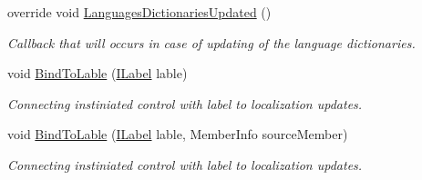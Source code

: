 \begin{DoxyCompactItemize}
override void \mbox{\hyperlink{class_wpf_handler_1_1_u_i_1_1_auto_layout_1_1_configuration_1_1_content_attribute_a498818bc121b7f408af302eb4085056a}{Languages\+Dictionaries\+Updated}} ()
\begin{DoxyCompactList}\small\item\em Callback that will occurs in case of updating of the language dictionaries. \end{DoxyCompactList}\item 
void \mbox{\hyperlink{class_wpf_handler_1_1_u_i_1_1_auto_layout_1_1_configuration_1_1_content_attribute_a6e768c541979b771942cf038e8ac084a}{Bind\+To\+Lable}} (\mbox{\hyperlink{interface_wpf_handler_1_1_u_i_1_1_controls_1_1_i_label}{I\+Label}} lable)
\begin{DoxyCompactList}\small\item\em Connecting instiniated control with label to localization updates. \end{DoxyCompactList}\item 
void \mbox{\hyperlink{class_wpf_handler_1_1_u_i_1_1_auto_layout_1_1_configuration_1_1_content_attribute_a6b3765fe9e02052ae0d76d6964205f97}{Bind\+To\+Lable}} (\mbox{\hyperlink{interface_wpf_handler_1_1_u_i_1_1_controls_1_1_i_label}{I\+Label}} lable, Member\+Info source\+Member)
\begin{DoxyCompactList}\small\item\em Connecting instiniated control with label to localization updates. \end{DoxyCompactList}\end{DoxyCompactItemize}
